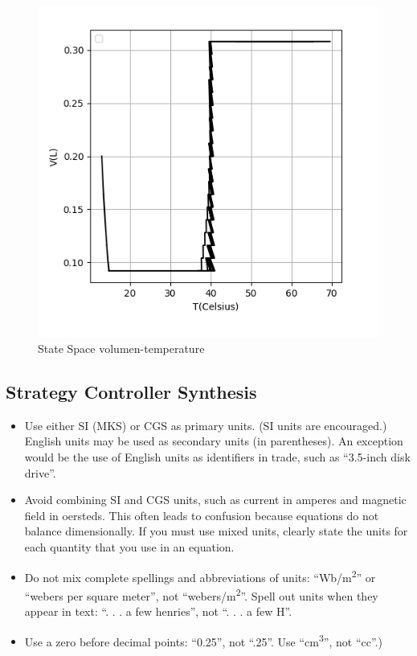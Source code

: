 \documentclass[conference]{IEEEtran}
\begin{document}
\begin{figure}[h]
  \includegraphics[scale = 0.5]{3}
  \caption{ State Space volumen-temperature}
  \centering
  \end{figure}

\subsection{Strategy Controller Synthesis}
\begin{itemize}
\item Use either SI (MKS) or CGS as primary units. (SI units are encouraged.) English units may be used as secondary units (in parentheses). An exception would be the use of English units as identifiers in trade, such as ``3.5-inch disk drive''.
\item Avoid combining SI and CGS units, such as current in amperes and magnetic field in oersteds. This often leads to confusion because equations do not balance dimensionally. If you must use mixed units, clearly state the units for each quantity that you use in an equation.
\item Do not mix complete spellings and abbreviations of units: ``Wb/m\textsuperscript{2}'' or ``webers per square meter'', not ``webers/m\textsuperscript{2}''. Spell out units when they appear in text: ``. . . a few henries'', not ``. . . a few H''.
\item Use a zero before decimal points: ``0.25'', not ``.25''. Use ``cm\textsuperscript{3}'', not ``cc''.)
\end{itemize}
\end{document}
